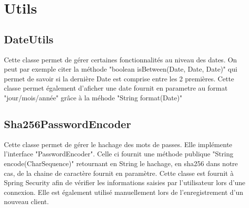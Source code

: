 	\section{Utils}

		\subsection{DateUtils}

			Cette classe permet de gérer certaines fonctionnalités au niveau des dates. On peut par exemple citer la méthode "boolean isBetween(Date, Date, Date)" qui permet de savoir si la dernière Date est comprise entre les 2 premières. Cette classe permet également d'aficher une date fournit en parametre au format "jour/mois/année" grâce à la méhode "String format(Date)"

		\subsection{Sha256PasswordEncoder}

			Cette classe permet de gérer le hachage des mots de passes. Elle implémente l'interface "PasswordEncoder". Celle ci fournit une méthode publique "String encode(CharSequence)" retournant en String le hachage, en sha256 dans notre cas, de la chaine de caractère fournit en paramètre. Cette classe est fournit à Spring Security afin de vérifier les informations saisies par l'utilisateur lors d'une connexion. Elle est également utilisé manuellement lors de l'enregistrement d'un nouveau client.
